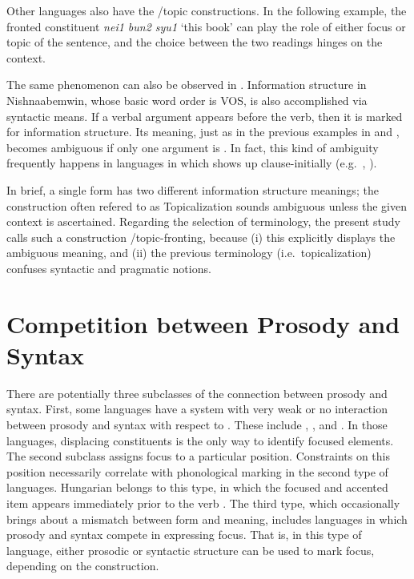 Other languages also have the /topic  constructions. In
the following  example, the fronted constituent \textit{nei1
  bun2 syu1} `this book' can play the role of either focus or topic of
the sentence, and the choice between the two readings hinges on the
context.





\noindent The same phenomenon can also be observed in
.  Information structure in Nishnaabemwin, whose
basic word order is VOS, is also accomplished via syntactic means.  If
a verbal argument appears before the verb, then it is marked for
information structure.  Its meaning, just as in the previous examples
in  and , becomes ambiguous if only one
argument is  \citep{valentine:01}.  In fact, this kind
of ambiguity frequently happens in languages in which  shows up
clause-initially (e.g.\ ,
\citep{nichols:11}).




In brief, a single form has two different information structure
meanings; the construction often refered to as Topicalization
\citep{prince:84} sounds ambiguous unless the given context is
ascertained.  Regarding the selection of terminology, the present
study calls such a construction /topic-fronting, because (i) this
explicitly displays the ambiguous meaning, and (ii) the previous
terminology (i.e.\ topicalization) confuses syntactic and pragmatic
notions.



\section{Competition between Prosody and Syntax}
\label{5:sec:competition}


There are potentially three subclasses of the connection between
prosody and syntax.  First, some languages have a system with very
weak or no interaction between prosody and syntax with respect to
. These include 
\citep{engdahl:vallduvi:96},  \citep{drubig:03}, and
 \citep{kugler:etal:07}. In those languages,
displacing constituents is the only way to identify focused
elements. The second subclass assigns focus to a particular
position. Constraints on this position necessarily correlate with
phonological marking in the second type of languages.  Hungarian
belongs to this type, in which the focused and accented item appears
immediately prior to the verb \citep{kiss:98,szendroi:01}. The third
type, which occasionally brings about a mismatch between form and
meaning, includes languages in which prosody and syntax compete in
expressing focus. That is, in this type of language,
either prosodic or syntactic structure can be used to mark focus,
depending on the construction.


